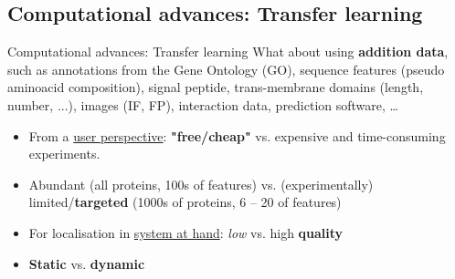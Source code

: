 


\subsection{Computational advances: Transfer learning}

\begin{frame}{Computational advances: Transfer learning}
  What about using \textbf{addition data}, such as annotations from
  the Gene Ontology (GO), sequence features (pseudo aminoacid
  composition), signal peptide, trans-membrane domains (length,
  number, ...), images (IF, FP), interaction data, prediction
  software, \ldots

  \begin{block}{}
    \begin{itemize}
    \item From a \underline{user perspective}: \textbf{"free/cheap"}
      vs. expensive and time-consuming experiments.
    \item Abundant (all proteins, 100s of features) vs. (experimentally)
      limited/\textbf{targeted} (1000s of proteins, 6 -- 20 of features)
    \item For localisation in \underline{system at hand}: \textit{low}
      vs. high \textbf{quality}
    \item \textbf{Static} vs. \textbf{dynamic}
    \end{itemize}
  \end{block}

\end{frame}

